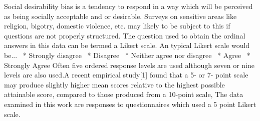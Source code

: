 \documentclass[12pt,twoside]{article}
\begin{document}
\newline
Social desirability bias is a tendency to respond in a way which will be
perceived as being socially acceptable and or desirable. Surveys on
sensitive areas like religion, bigotry, domestic violence, etc. may
likely to be subject to this if questions are not properly
structured.\newline
\newline
The question used to obtain the ordinal answers in this data can be
termed a Likert scale. An typical Likert scale would be...\newline
\newline
~* Strongly disagree\newline
~* Disagree\newline
~* Neither agree nor disagree\newline
~* Agree\newline
~* Strongly Agree\newline
\newline
Often five ordered response levels are used although seven or nine
levels are also used.A recent empirical study[1] found that a 5{}- or
7{}- point scale may produce slightly higher mean scores relative to
the highest possible attainable score, compared to those produced from
a 10{}-point scale,\newline
\newline
The data examined in this work are responses to questionnaires which
used a 5 point Likert scale.
\end{document}

